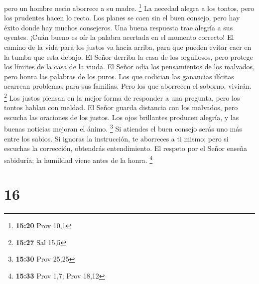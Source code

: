 pero un hombre necio aborrece a su madre. \footnote{\textbf{15:20} Prov
  10,1}  La necedad alegra a los tontos, pero los prudentes
hacen lo recto.  Los planes se caen sin el buen consejo,
pero hay éxito donde hay muchos consejeros.  Una buena
respuesta trae alegría a sus oyentes. ¡Cuán bueno es oír la palabra
acertada en el momento correcto!  El camino de la vida para
los justos va hacia arriba, para que pueden evitar caer en la tumba que
esta debajo.  El Señor derriba la casa de los orgullosos,
pero protege los límites de la casa de la viuda.  El Señor
odia los pensamientos de los malvados, pero honra las palabras de los
puros.  Los que codician las ganancias ilícitas acarrean
problemas para sus familias. Pero los que aborrecen el soborno, vivirán.
\footnote{\textbf{15:27} Sal 15,5}  Los justos piensan en
la mejor forma de responder a una pregunta, pero los tontos hablan con
maldad.  El Señor guarda distancia con los malvados, pero
escucha las oraciones de los justos.  Los ojos brillantes
producen alegría, y las buenas noticias mejoran el ánimo. \footnote{\textbf{15:30}
  Prov 25,25}  Si atiendes el buen consejo serás uno más
entre los sabios.  Si ignoras la instrucción, te aborreces
a ti mismo; pero si escuchas la corrección, obtendrás entendimiento.
 El respeto por el Señor enseña sabiduría; la humildad
viene antes de la honra. \footnote{\textbf{15:33} Prov 1,7; Prov 18,12}

\hypertarget{section-15}{%
\section{16}\label{section-15}}

